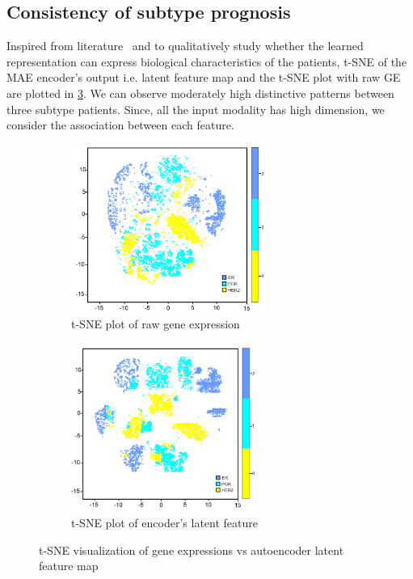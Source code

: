 \iffalse
\subsection{Consistency of subtype prognosis}
Inspired from literature~\cite{rhee2017hybrid} and to qualitatively study whether the learned representation can express biological characteristics of the patients, t-SNE of the MAE encoder's output i.e. latent feature map and the t-SNE plot with raw GE are plotted in \cref{fig:tnse}. We can observe moderately high distinctive patterns between three subtype patients. Since, all the input modality has high dimension, we consider the association between each feature. 

\begin{figure}[h]
	\centering
	\begin{subfigure}{.48\linewidth}
		\centering
		\includegraphics[width=0.9\linewidth,height=55mm]{images/raw_tsne.png}
		\caption{t-SNE plot of raw gene expression}
        \label{fig:tsne_raw}
	\end{subfigure}
	\begin{subfigure}{0.48\linewidth}
		\centering
		\includegraphics[width=0.9\linewidth,height=55mm]{images/ae_tsne.png}
		\caption{t-SNE plot of encoder's latent feature}
        \label{fig:tsne_ae}
	\end{subfigure}
	 \setlength{\belowcaptionskip}{-8pt}
	\caption{t-SNE visualization of gene expressions vs autoencoder latent feature map~\cite{karimACCESS2019}} 
	\label{fig:tnse}
\end{figure}


